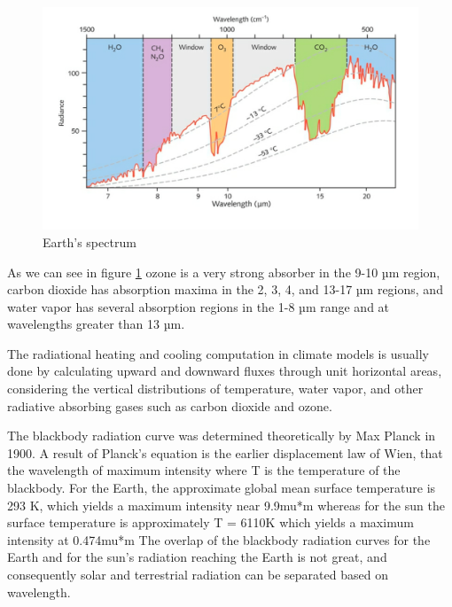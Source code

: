 \begin{figure}[h!]
	\centering
	\includegraphics[width=0.5\linewidth]{uploads/image10.png}
	\caption{Earth's spectrum}
	\label{fig:enter-label}
\end{figure}
As we can see in figure \ref{fig:enter-label} ozone is a very strong absorber in the 9-10 µm region, carbon dioxide has absorption maxima in the 2, 3, 4, and 13-17 µm regions, and water vapor has several absorption regions in the 1-8 µm range and at wavelengths greater than 13 µm.

The radiational heating and cooling computation in climate models is usually done by calculating upward and downward fluxes through unit horizontal areas, considering the vertical distributions of temperature, water vapor, and other radiative absorbing gases such as carbon dioxide and ozone.

The blackbody radiation curve was determined theoretically by Max Planck in 1900. A result of Planck's equation is the earlier displacement law of Wien, that the wavelength of maximum intensity  where T is the temperature of the blackbody.
For the Earth, the approximate global mean surface temperature is 293 K, which yields a maximum intensity near 9.9mu*m whereas for the sun the surface temperature is approximately T = 6110K which yields a maximum intensity at 0.474mu*m The overlap of the blackbody radiation curves for the Earth and for the sun's radiation reaching the Earth is not great, and consequently solar and terrestrial radiation can be separated based on wavelength.

